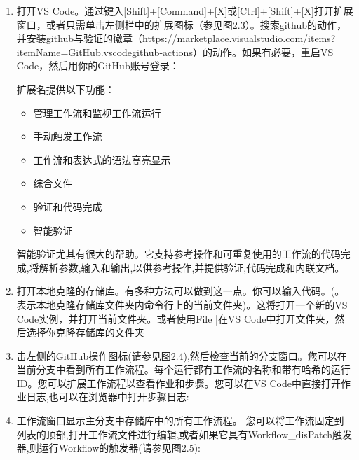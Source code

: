 \begin{enumerate}
\item 
打开VS Code。通过键入[Shift]+[Command]+[X]或[Ctrl]+[Shift]+[X]打开扩展窗口，或者只需单击左侧栏中的扩展图标（参见图2.3）。搜索github的动作，并安装github与验证的徽章（\url{https://marketplace.visualstudio.com/items?itemName=GitHub.vscodegithub-actions}）的动作。如果有必要，重启VS Code，然后用你的GitHub账号登录：


扩展名提供以下功能：

\begin{itemize}
\item 
管理工作流和监视工作流运行

\item 
手动触发工作流

\item 
工作流和表达式的语法高亮显示

\item 
综合文件

\item 
验证和代码完成

\item 
智能验证
\end{itemize}

智能验证尤其有很大的帮助。它支持参考操作和可重复使用的工作流的代码完成,将解析参数,输入和输出,以供参考操作,并提供验证,代码完成和内联文档。

\item 
打开本地克隆的存储库。有多种方法可以做到这一点。你可以输入代码。(。表示本地克隆存储库文件夹内命令行上的当前文件夹)。这将打开一个新的VS Code实例，并打开当前文件夹。或者使用File |在VS Code中打开文件夹，然后选择你克隆存储库的文件夹

\item 
击左侧的GitHub操作图标(请参见图2.4),然后检查当前的分支窗口。您可以在当前分支中看到所有工作流程。每个运行都有工作流的名称和带有哈希的运行ID。您可以扩展工作流程以查看作业和步骤。您可以在VS Code中直接打开作业日志,也可以在浏览器中打开步骤日志:


\item 
工作流窗口显示主分支中存储库中的所有工作流程。 您可以将工作流固定到列表的顶部,打开工作流文件进行编辑,或者如果它具有Workflow\_disPatch触发器,则运行Workflow的触发器(请参见图2.5):


\end{enumerate}
